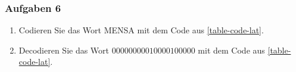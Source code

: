 \subsubsection{Aufgaben 6}

\begin{enumerate}
\item Codieren Sie das Wort MENSA mit dem Code aus \autoref{table-code-lat}.
\item Decodieren Sie das Wort $00000000010000100000$ mit dem Code aus \autoref{table-code-lat}.
\end{enumerate}